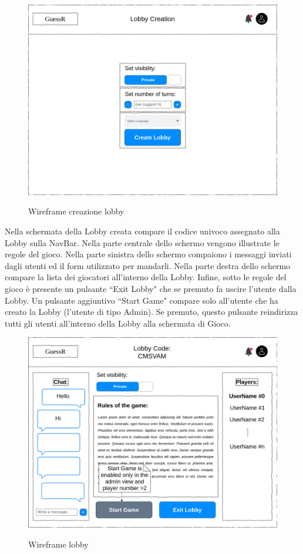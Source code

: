 \begin{figure}[H]
    \caption{Wireframe creazione lobby}
    \centering
    \includegraphics[width=\linewidth]{img/wireframes/lobby_creation.png}
    \label{fig:wireframe_lobby_creation}
\end{figure}

\noindent Nella schermata della Lobby creata compare il codice univoco assegnato alla Lobby sulla NavBar. Nella parte centrale dello schermo vengono illustrate le regole del gioco. Nella parte sinistra dello schermo compaiono i messaggi inviati dagli utenti ed il form utilizzato per mandarli. Nella parte destra dello schermo compare la lista dei giocatori all'interno della Lobby.
Infine, sotto le regole del gioco è presente un pulsante ``Exit Lobby" che se premuto fa uscire l'utente dalla Lobby. Un pulsante aggiuntivo ``Start Game" compare solo all'utente che ha creato la Lobby (l'utente di tipo Admin). Se premuto, questo pulsante reindirizza tutti gli utenti all'interno della Lobby alla schermata di Gioco.

\begin{figure}[H]
    \caption{Wireframe lobby}
    \centering
    \includegraphics[width=\linewidth]{img/wireframes/in_lobby.png}
    \label{fig:wireframe_in_lobby}
\end{figure}

